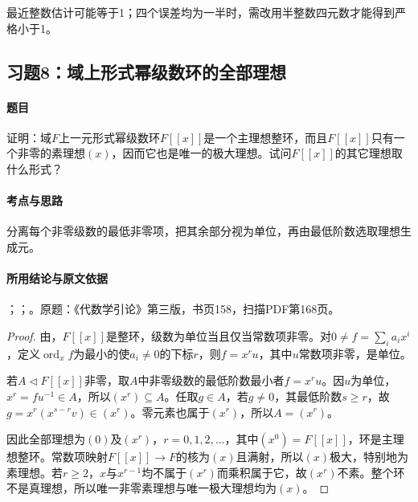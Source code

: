 最近整数估计可能等于1；四个误差均为一半时，需改用半整数四元数才能得到严格小于1。

\subsection{习题8：域上形式幂级数环的全部理想}

\label{ex:4:8}

\paragraph{题目}

证明：域$F$上一元形式幂级数环$F[[x]]$是一个主理想整环，而且$F[[x]]$只有一个非零的素理想$(x)$，因而它也是唯一的极大理想。试问$F[[x]]$的其它理想取什么形式？

\paragraph{考点与思路}

分离每个非零级数的最低非零项，把其余部分视为单位，再由最低阶数选取理想生成元。

\paragraph{所用结论与原文依据}

；；。原题：《代数学引论》第三版，书页158，扫描PDF第168页。


\begin{proof}

由，$F[[x]]$是整环，级数为单位当且仅当常数项非零。对$0\ne f=\sum_i a_ix^i$，定义$\operatorname{ord}_x f$为最小的使$a_i\ne0$的下标$r$，则$f=x^r u$，其中$u$常数项非零，是单位。

若$A\lhd F[[x]]$非零，取$A$中非零级数的最低阶数最小者$f=x^r u$。因$u$为单位，$x^r=fu^{-1}\in A$，所以$(x^r)\subseteq A$。任取$g\in A$，若$g\ne0$，其最低阶数$s\ge r$，故$g=x^r(x^{s-r}v)\in(x^r)$。零元素也属于$(x^r)$，所以$A=(x^r)$。

因此全部理想为$(0)$及$(x^r)$，$r=0,1,2,\ldots$，其中$(x^0)=F[[x]]$，环是主理想整环。常数项映射$F[[x]]\to F$的核为$(x)$且满射，所以$(x)$极大，特别地为素理想。若$r\ge2$，$x$与$x^{r-1}$均不属于$(x^r)$而乘积属于它，故$(x^r)$不素。整个环不是真理想，所以唯一非零素理想与唯一极大理想均为$(x)$。

\end{proof}

